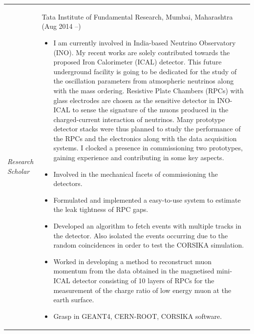 \documentclass[12pt]{article}
\begin{document}
\begin{minipage}{1.05\textwidth}
\vspace{0.4cm}
\begin{tabular}{p{3.5cm} p{13.5cm} }
  {\emph{Research Scholar}} & Tata Institute of Fundamental Research, Mumbai, Maharashtra (Aug 2014 --)

\begin{itemize}
\item\mbox{} I am currently involved in India-based Neutrino
  Observatory (INO). My recent works are solely contributed towards
  the proposed Iron Calorimeter (ICAL) detector. This future
  underground facility is going to be dedicated for the study of the
  oscillation parameters from atmospheric neutrinos along with
  the mass ordering. Resistive Plate Chambers (RPCs) with glass
  electrodes are chosen as the sensitive detector in INO-ICAL to
  sense the signature of the muons produced in the charged-current
  interaction of neutrinos. Many prototype detector stacks were thus
  planned to study the performance of the RPCs and the electronics
  along with the data acquisition systems. I clocked a presence
  in commissioning two prototypes, gaining experience and contributing
  in some key aspects.
\item Involved in the mechanical facets of commissioning the detectors.
\item Formulated and implemented a easy-to-use system to estimate the
  leak tightness of RPC gaps.
\item Developed an algorithm to fetch events with multiple tracks
  in the detector. Also isolated the events occurring due to the
  random coincidences in order to test the CORSIKA simulation.
\item Worked in developing a method to reconstruct muon momentum
  from the data obtained in the magnetised mini-ICAL detector
  consisting of 10 layers of RPCs for the measurement of the charge
  ratio of low energy muon at the earth surface.
\item Grasp in GEANT4, CERN-ROOT, CORSIKA software.

\end{itemize}
\end{tabular}
\end{minipage}
\end{document}
